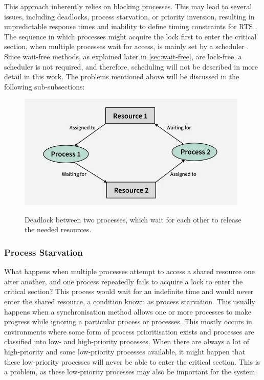 This approach inherently relies on blocking processes. This may lead to several issues, including deadlocks, process starvation, or priority inversion, resulting in unpredictable response times and inability to define timing constraints for \ac{RTS} \cite{brandenburg2019multiprocessorrealtimelockingprotocols}. The sequence in which processes might acquire the lock first to enter the critical section, when multiple processes wait for access, is mainly set by a scheduler \cite{brandenburg2019multiprocessorrealtimelockingprotocols}. Since wait-free methods, as explained later in \cref{sec:wait-free}, are lock-free, a scheduler is not required, and therefore, scheduling will not be described in more detail in this work. The problems mentioned above will be discussed in the following sub-subsections:

\begin{figure}[!ht]
    \centering
    \captionsetup{justification=centering}
    \caption{Deadlock between two processes, which wait for each other to release the needed resources.}
    \includegraphics[width=110mm]{images/deadlock.png}
    \cite{Deadlock}
    \label{fig:deadlock}
\end{figure}

\subsubsection{Process Starvation}\label{subsubsec:process-starvation}

What happens when multiple processes attempt to access a shared resource one after another, and one process repeatedly fails to acquire a lock to enter the critical section? This process would wait for an indefinite time and would never enter the shared resource, a condition known as process starvation. This usually happens when a synchronisation method allows one or more processes to make progress while ignoring a particular process or processes. This mostly occurs in environments where some form of process prioritisation exists and processes are classified into low- and high-priority processes. When there are always a lot of high-priority and some low-priority processes available, it might happen that these low-priority processes will never be able to enter the critical section. This is a problem, as these low-priority processes may also be important for the system. \cite{Starvation}


